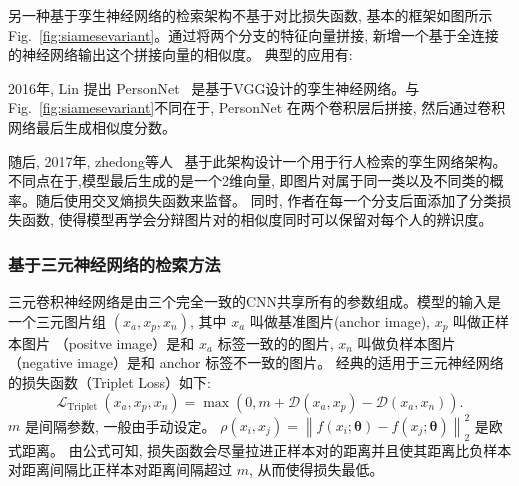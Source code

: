 另一种基于孪生神经网络的检索架构不基于对比损失函数,  基本的框架如图所示Fig.~\ref{fig:siamesevariant}。通过将两个分支的特征向量拼接, 新增一个基于全连接的神经网络输出这个拼接向量的相似度。 典型的应用有:\par
2016年, Lin 提出 PersonNet~\cite{wu2016personnet} 是基于VGG设计的孪生神经网络。与Fig.~\ref{fig:siamesevariant}不同在于, PersonNet 在两个卷积层后拼接, 然后通过卷积网络最后生成相似度分数。 \par
随后, 2017年, zhedong等人~\cite{zheng2017discriminatively} 基于此架构设计一个用于行人检索的孪生网络架构。不同点在于,模型最后生成的是一个2维向量, 即图片对属于同一类以及不同类的概率。随后使用交叉熵损失函数来监督。 同时, 作者在每一个分支后面添加了分类损失函数, 使得模型再学会分辩图片对的相似度同时可以保留对每个人的辨识度。
\subsubsection{基于三元神经网络的检索方法}
三元卷积神经网络是由三个完全一致的CNN共享所有的参数组成。模型的输入是一个三元图片组 $(x_a, x_p, x_n)$, 其中 $x_a$ 叫做基准图片(anchor image), $x_p$ 叫做正样本图片 （positve image）是和 $x_a$ 标签一致的的图片, $x_n$ 叫做负样本图片 （negative image）是和 anchor 标签不一致的图片。 经典的适用于三元神经网络的损失函数（Triplet Loss）如下:
\begin{equation}
    \mathcal{L}_{\text {Triplet }}\left(x_a, x_p, x_n\right)=\max \left(0, m+\mathcal{D}\left(x_a, x_p\right)-\mathcal{D}\left(x_a, x_n\right)\right).
    \label{eq:triplet}
\end{equation}
$m$ 是间隔参数, 一般由手动设定。
$
    \rho\left(x_i, x_j\right)=\left\|f\left(x_i ; \boldsymbol{\theta}\right)-f\left(x_j ; \boldsymbol{\theta}\right)\right\|_2^2
$ 是欧式距离。 由公式可知, 损失函数会尽量拉进正样本对的距离并且使其距离比负样本对距离间隔比正样本对距离间隔超过 $m$, 从而使得损失最低。 \par

